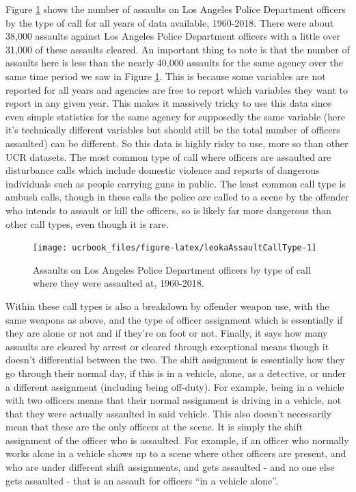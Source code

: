 \documentclass[
  12pt,
  openany]{book}
\begin{document}
Figure \ref{fig:leokaAssaultCallType} shows the number of assaults on Los Angeles Police Department officers by the type of call for all years of data available, 1960-2018. There were about 38,000 assaults against Los Angeles Police Department officers with a little over 31,000 of these assaults cleared. An important thing to note is that the number of assaults here is less than the nearly 40,000 assaults for the same agency over the same time period we saw in Figure \ref{fig:leokaAssaultCallType}. This is because some variables are not reported for all years and agencies are free to report which variables they want to report in any given year. This makes it massively tricky to use this data since even simple statistics for the same agency for supposedly the same variable (here it's technically different variables but should still be the total number of officers assaulted) can be different. So this data is highly risky to use, more so than other UCR datasets. The most common type of call where officers are assaulted are disturbance calls which include domestic violence and reports of dangerous individuals such as people carrying guns in public. The least common call type is ambush calls, though in these calls the police are called to a scene by the offender who intends to assault or kill the officers, so is likely far more dangerous than other call types, even though it is rare.

\begin{figure}

{\centering \texttt{[image: ucrbook\_files/figure-latex/leokaAssaultCallType-1]} 

}

\caption{Assaults on Los Angeles Police Department officers by type of call where they were assaulted at, 1960-2018.}\label{fig:leokaAssaultCallType}
\end{figure}

Within these call types is also a breakdown by offender weapon use, with the same weapons as above, and the type of officer assignment which is essentially if they are alone or not and if they're on foot or not. Finally, it says how many assaults are cleared by arrest or cleared through exceptional means though it doesn't differential between the two. The shift assignment is essentially how they go through their normal day, if this is in a vehicle, alone, as a detective, or under a different assignment (including being off-duty). For example, being in a vehicle with two officers means that their normal assignment is driving in a vehicle, not that they were actually assaulted in said vehicle. This also doesn't necessarily mean that these are the only officers at the scene. It is simply the shift assignment of the officer who is assaulted. For example, if an officer who normally works alone in a vehicle shows up to a scene where other officers are present, and who are under different shift assignments, and gets assaulted - and no one else gets assaulted - that is an assault for officers ``in a vehicle alone''.
\end{document}
